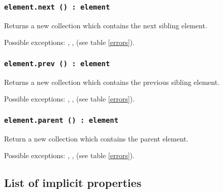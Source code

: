 \subsubsection{\texttt{element.next () : element}}

Returns a new collection which contains the next sibling element.

Possible exceptions: , ,  (see table \ref{errors}).

\subsubsection{\texttt{element.prev () : element}}

Returns a new collection which contains the previous sibling element.

Possible exceptions: , ,  (see table \ref{errors}).

\subsubsection{\texttt{element.parent () : element}}

Return a new collection which contains the parent element.

Possible exceptions: , ,  (see table \ref{errors}).

\subsection{List of implicit properties}
\label{elements:predefined:properties}

